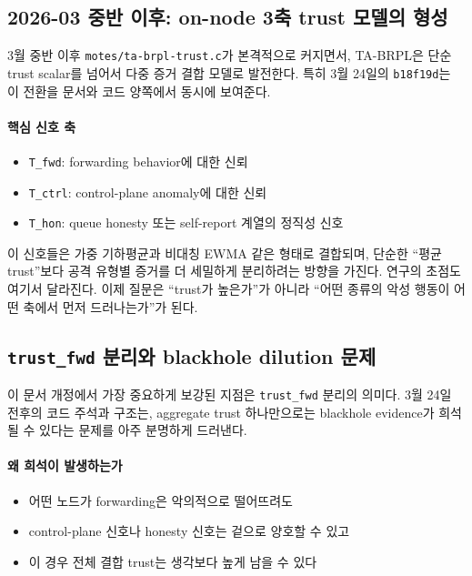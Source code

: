 \documentclass[12pt,a4paper]{article}
\begin{document}
\subsection{2026-03 중반 이후: on-node 3축 trust 모델의 형성}

3월 중반 이후 \texttt{motes/ta-brpl-trust.c}가 본격적으로 커지면서,
TA-BRPL은 단순 trust scalar를 넘어서 다중 증거 결합 모델로 발전한다.
특히 3월 24일의 \texttt{b18f19d}는 이 전환을 문서와 코드 양쪽에서 동시에 보여준다.

\paragraph{핵심 신호 축}
\begin{itemize}[leftmargin=1.5em]
\item \texttt{T\_fwd}: forwarding behavior에 대한 신뢰
\item \texttt{T\_ctrl}: control-plane anomaly에 대한 신뢰
\item \texttt{T\_hon}: queue honesty 또는 self-report 계열의 정직성 신호
\end{itemize}

이 신호들은 가중 기하평균과 비대칭 EWMA 같은 형태로 결합되며,
단순한 ``평균 trust''보다 공격 유형별 증거를 더 세밀하게 분리하려는 방향을 가진다.
연구의 초점도 여기서 달라진다. 이제 질문은
``trust가 높은가''가 아니라 ``어떤 종류의 악성 행동이 어떤 축에서 먼저 드러나는가''가 된다.

\subsection{\texttt{trust\_fwd} 분리와 blackhole dilution 문제}

이 문서 개정에서 가장 중요하게 보강된 지점은
\texttt{trust\_fwd} 분리의 의미다. 3월 24일 전후의 코드 주석과 구조는,
aggregate trust 하나만으로는 blackhole evidence가 희석될 수 있다는 문제를
아주 분명하게 드러낸다.

\paragraph{왜 희석이 발생하는가}
\begin{itemize}[leftmargin=1.5em]
\item 어떤 노드가 forwarding은 악의적으로 떨어뜨려도
\item control-plane 신호나 honesty 신호는 겉으로 양호할 수 있고
\item 이 경우 전체 결합 trust는 생각보다 높게 남을 수 있다
\end{itemize}
\end{document}
